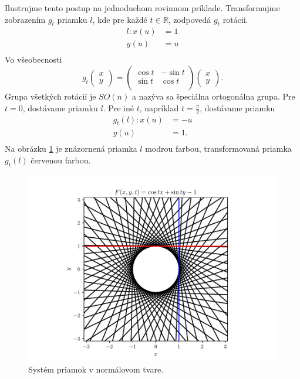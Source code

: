 \begin{example}
Ilustrujme tento postup na jednoduchom rovinnom príklade. Transformujme zobrazením $g_t$ priamku $l$, kde pre každé $t \in \mathbb{R}$, zodpovedá $g_t$ rotácii.
\begin{align*}
l \colon x(u) &= 1 \\
y(u) &= u \\
\end{align*}
Vo všeobecnosti
\[
g_t \begin{pmatrix} x \\ y \end{pmatrix} = \begin{pmatrix}
\cos t & -\sin t  \\
\sin t & \cos t  \\
\end{pmatrix}
\begin{pmatrix} x \\ y \end{pmatrix}.
\]
Grupa všetkých rotácií je $SO(n)$ a nazýva sa špeciálna ortogonálna grupa. Pre $t = 0$, dostávame priamku $l$. Pre iné $t$, napríklad $t = \frac{\pi}{2}$, dostávame priamku 
\begin{align*}
g_t(l) \colon x(u) &= -u \\
y(u) &= 1. \\
\end{align*}
Na obrázku \ref{fig:lines_in_normal_form} je znázornená priamka $l$ modrou farbou, transformovaná priamka $g_t(l)$ červenou farbou.

\begin{figure}[H]
	\centering
	\includegraphics[trim={0 0.35cm 0 0.85cm},clip]{images/lines_in_normal_form.pdf}
	\caption{Systém priamok v normálovom tvare.}
	\label{fig:lines_in_normal_form}
\end{figure}

\end{example}

